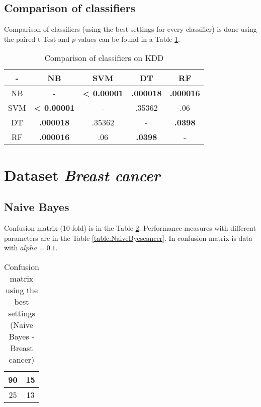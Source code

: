\documentclass[11pt,a4paper,titlepage]{article}
\begin{document}
\subsection{Comparison of classifiers}
Comparison of classifiers (using the best settings for every classifier) is done using the paired t-Test and $p$-values can be found in a Table \ref{table:comparisonKDD}.


  \begin{table}
  \centering
  \begin{tabular}{| c | c | c | c | c |}
    \hline
     		-	   & NB 	  & 	SVM 	& DT		 & RF \\ \hline
    NB 			   &  - 	  &     \textbf{< 0.00001}	& 		\textbf{.000018}	 & 	 \textbf{.000016}  		\\ \hline
    SVM 		   & 	\textbf{< 0.00001}	  & 	- 		& 			.35362	 &	.06 		\\ \hline
    DT 			   &  \textbf{.000018} &	.35362	& 		-	 &		\textbf{.0398}		\\ \hline
    RF 			   &  \textbf{.000016}  & 	 .06	& 	\textbf{.0398}	 &	-			\\
    \hline
  \end{tabular}
  \caption{Comparison of classifiers on KDD}
  \label{table:comparisonKDD}
  \end{table}




\section{Dataset \textit{Breast cancer}}

\subsection{Naive Bayes}
Confusion matrix (10-fold) is in the Table \ref{table:confusionMatrixNaiveBayescancer}. Performance measures with different parameters are in the Table \ref{table:NaiveByescancer}. In confusion matrix is data with $alpha = 0.1$. 
\begin{table}
  \centering
  \begin{tabular}{| c | c |}
    \hline
   	   90   & 15 \\ \hline
         25 &  13 \\
    \hline
  \end{tabular}
  \caption{Confusion matrix using the best settings (Naive Bayes - Breast cancer)}
  \label{table:confusionMatrixNaiveBayescancer}
  \end{table}
  
\end{document}
